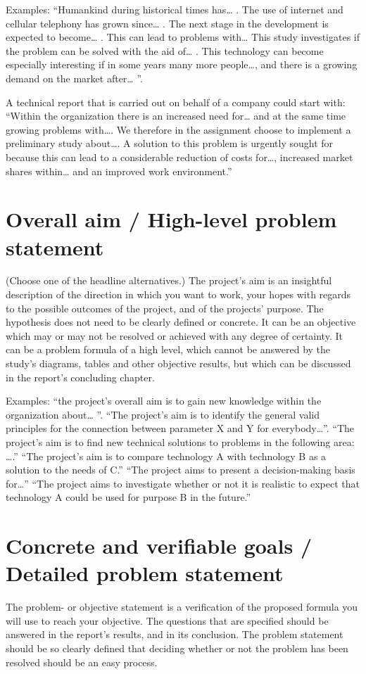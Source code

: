 Examples: “Humankind during historical times has… . The use of
internet and cellular telephony has grown since… . The next stage in the
development is expected to become… . This can lead to problems
with… This study investigates if the problem can be solved with the aid
of… . This technology can become especially interesting if in some years
many more people…, and there is a growing demand on the market
after… ”.

A technical report that is carried out on behalf of a company could start
with: “Within the organization there is an increased need for… and at
the same time growing problems with…. We therefore in the
assignment choose to implement a preliminary study about…. A
solution to this problem is urgently sought for because this can lead to a
considerable reduction of costs for…, increased market shares within…
and an improved work environment.”

\section{Overall aim / High-level problem statement}
(Choose one of the headline alternatives.) The project's aim is an
insightful description of the direction in which you want to work, your
hopes with regards to the possible outcomes of the project, and of the
projects' purpose. The hypothesis does not need to be clearly defined or
concrete. It can be an objective which may or may not be resolved or
achieved with any degree of certainty. It can be a problem formula of a
high level, which cannot be answered by the study's diagrams, tables
and other objective results, but which can be discussed in the report's
concluding chapter.

Examples: “the project's overall aim is to gain new knowledge within
the organization about… ”. “The project's aim is to identify the general
valid principles for the connection between parameter X and Y for
everybody…”. “The project's aim is to find new technical solutions to
problems in the following area: ….” “The project's aim is to compare
technology A with technology B as a solution to the needs of C.” “The
project aims to present a decision-making basis for…” “The project aims
to investigate whether or not it is realistic to expect that technology A
could be used for purpose B in the future.”

\section{Concrete and verifiable goals / Detailed problem statement}
The problem- or objective statement is a verification of the proposed
formula you will use to reach your objective. The questions that are
specified should be answered in the report's results, and in its
conclusion. The problem statement should be so clearly defined that
deciding whether or not the problem has been resolved should be an
easy process.

